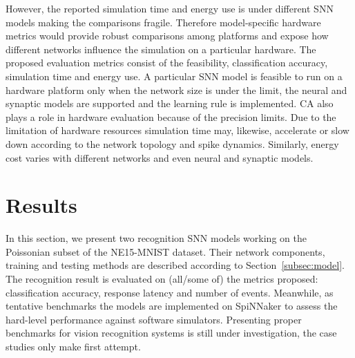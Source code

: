 \documentclass{frontiersENG} %
\begin{document}
However, the reported simulation time and energy use is under different SNN models making the comparisons fragile.
Therefore model-specific hardware metrics would provide robust comparisons among platforms and expose how different networks influence the simulation on a particular hardware.
The proposed evaluation metrics consist of the feasibility, classification accuracy, simulation time and energy use.
A particular SNN model is feasible to run on a hardware platform only when the  network size is under the limit, the neural and synaptic models are supported and the learning rule is implemented.
CA also plays a role in hardware evaluation because of the precision limits.
Due to the limitation of hardware resources simulation time may, likewise, accelerate or slow down according to the network topology and spike dynamics.
Similarly, energy cost varies with different networks and even neural and synaptic models.

\section{Results}
\label{sec:test}
In this section, we present two recognition SNN models working on the Poissonian subset of the NE15-MNIST dataset.
Their network components, training and testing methods are described according to Section~\ref{subsec:model}.
The recognition result is evaluated on (all/some of) the metrics proposed: classification accuracy, response latency and number of events.
Meanwhile, as tentative benchmarks the models are implemented on SpiNNaker to assess the hard-level performance against software simulators.
Presenting proper benchmarks for vision recognition systems is still under investigation, the case studies only make first attempt.
\end{document}

